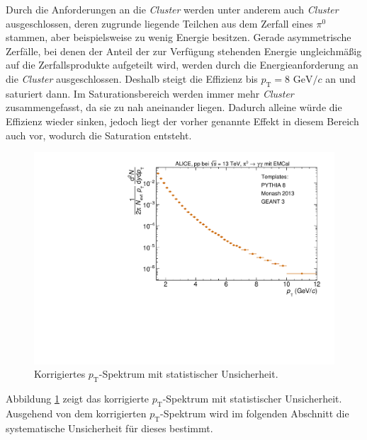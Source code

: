 Durch die Anforderungen an die \textit{Cluster} werden unter anderem auch \textit{Cluster} ausgeschlossen, deren zugrunde liegende Teilchen aus dem Zerfall eines $\pi^{0}$ stammen, aber beispielsweise zu wenig Energie besitzen.
Gerade asymmetrische Zerfälle, bei denen der Anteil der zur Verfügung stehenden Energie ungleichmäßig auf die Zerfallsprodukte aufgeteilt wird, werden durch die Energieanforderung an die \textit{Cluster} ausgeschlossen.
Deshalb steigt die Effizienz bis $p_\text{T} = 8 \text{ GeV}/c$ an und saturiert dann.
Im Saturationsbereich werden immer mehr \textit{Cluster} zusammengefasst, da sie zu nah aneinander liegen.
Dadurch alleine würde die Effizienz wieder sinken, jedoch liegt der vorher genannte Effekt in diesem Bereich auch vor, wodurch die Saturation entsteht.
\begin{figure}[t!]
\centering
\includegraphics[width=.65\linewidth]{KorrigierterYieldNurStat_Data_2016.pdf}
\caption{Korrigiertes $p_\text{T}$-Spektrum mit statistischer Unsicherheit.
}
\label{fig:YieldStatUncer}
\end{figure}
\newline
Abbildung \ref{fig:YieldStatUncer} zeigt das korrigierte $p_\text{T}$-Spektrum mit statistischer Unsicherheit.
Ausgehend von dem korrigierten $p_\text{T}$-Spektrum wird im folgenden Abschnitt die systematische Unsicherheit für dieses bestimmt.